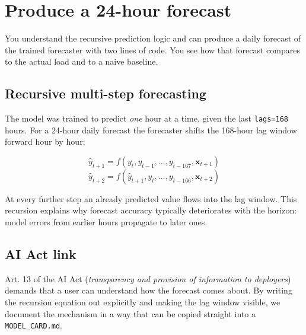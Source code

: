 \documentclass[
  english,
  letterpaper,
]{scrbook}
\begin{document}

\chapter{Produce a 24-hour forecast}\label{sec-forecast}

\begin{tcolorbox}[enhanced jigsaw, arc=.35mm, bottomrule=.15mm, bottomtitle=1mm, breakable, colback=white, colbacktitle=quarto-callout-note-color!10!white, colframe=quarto-callout-note-color-frame, coltitle=black, left=2mm, leftrule=.75mm, opacityback=0, opacitybacktitle=0.6, rightrule=.15mm, title=\textcolor{quarto-callout-note-color}{\faInfo}\hspace{0.5em}{Learning objective}, titlerule=0mm, toprule=.15mm, toptitle=1mm]

You understand the recursive prediction logic and can produce a daily
forecast of the trained forecaster with two lines of code. You see how
that forecast compares to the actual load and to a naive baseline.

\end{tcolorbox}

\section{Recursive multi-step
forecasting}\label{recursive-multi-step-forecasting}

The model was trained to predict \emph{one} hour at a time, given the
last \texttt{lags=168} hours. For a 24-hour daily forecast the
forecaster shifts the 168-hour lag window forward hour by hour:

\[
\hat y_{t+1} = f(y_t, y_{t-1}, \dots, y_{t-167}, \mathbf{x}_{t+1})
\] \[
\hat y_{t+2} = f(\hat y_{t+1}, y_t, \dots, y_{t-166}, \mathbf{x}_{t+2})
\]

At every further step an already predicted value flows into the lag
window. This recursion explains why forecast accuracy typically
deteriorates with the horizon: model errors from earlier hours propagate
to later ones.

\section{AI Act link}\label{ai-act-link-4}

Art. 13 of the AI Act (\emph{transparency and provision of information
to deployers}) demands that a user can understand how the forecast comes
about. By writing the recursion equation out explicitly and making the
lag window visible, we document the mechanism in a way that can be
copied straight into a \texttt{MODEL\_CARD.md}.
\end{document}
